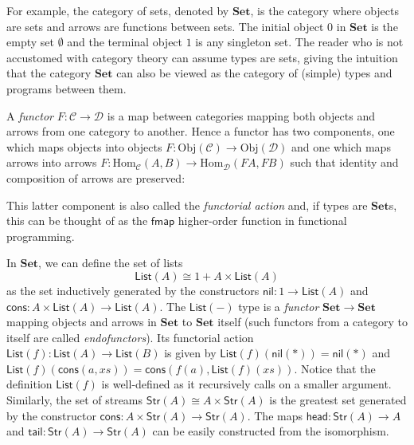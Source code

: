 \documentclass[a4paper,anonymous, UKenglish,cleveref, autoref, thm-restate]{lipics-v2021}
\newcommand{\operator}[1]{\textsf{#1}}
\newcommand{\head}{\operator{head}}
\newcommand{\tail}{\operator{tail}}
\newcommand{\CatC}{\mathcal{C}}
\newcommand{\CatD}{\mathcal{D}}
\newcommand{\Set}{\mathbf{Set}}
\newcommand{\iso}{\cong}
\newcommand{\Hom}{\text{Hom}}
\newcommand{\Obj}{\text{Obj}}
\newcommand{\Str}[1]{\operator{Str}(#1)}
\newcommand{\List}[1]{\operator{List}(#1)}
\newcommand{\nil}{\operator{nil}}
\newcommand{\cons}{\operator{cons}}
\begin{document}
For example, the category of sets, denoted by $\Set$, is the category where
objects are sets and arrows are functions between sets. The initial object $0$
in $\Set$ is the empty set $\emptyset$ and the terminal object $1$ is any
singleton set. The reader who is not accustomed with category theory can assume
types are sets, giving the intuition that the category $\Set$ can also be viewed
as the category of (simple) types and programs between them.

A \emph{functor} $F : \CatC \to \CatD$ is a map between categories mapping both
objects and arrows from one category to another. Hence a functor has two
components, one which maps objects into objects
$F : \Obj(\CatC) \to \Obj(\CatD)$ and one which maps arrows into arrows
$F : \Hom_{\CatC}(A, B) \to \Hom_{\CatD} (FA,FB)$ such that identity and
composition of arrows are preserved:
This latter component is also called the \emph{functorial action} and, if types
are $\Set$s, this can be thought of as the $\operator{fmap}$ higher-order
function in functional programming.

In $\Set$, we can define the set of lists
\[
  \List{A} \iso 1 + A \times \List{A}
\]
as the set inductively generated by the constructors $\nil : 1 \to \List{A}$ and
$\cons : A \times \List{A} \to \List{A}$. The $\List{-}$ type is a
\emph{functor} $\Set \to \Set$ mapping objects and arrows in $\Set$ to $\Set$
itself (such functors from a category to itself are called \emph{endofunctors}).
Its functorial action $\List{f} : \List{A} \to \List{B}$ is given by
$\List{f}(\nil(*)) = \nil(*)$ and $\List{f}(\cons(a,xs)) = \cons(f(a),
\List{f}(xs))$. Notice that the definition $\List{f}$ is well-defined as it
recursively calls on a smaller argument.  Similarly, the set of streams $\Str{A}
\iso A \times \Str{A}$ is the greatest set generated by the constructor $\cons :
A \times \Str{A} \to \Str{A}$. The maps $\head : \Str{A} \to A$ and $\tail :
\Str{A} \to \Str{A}$ can be easily constructed from the isomorphism.
\end{document}
